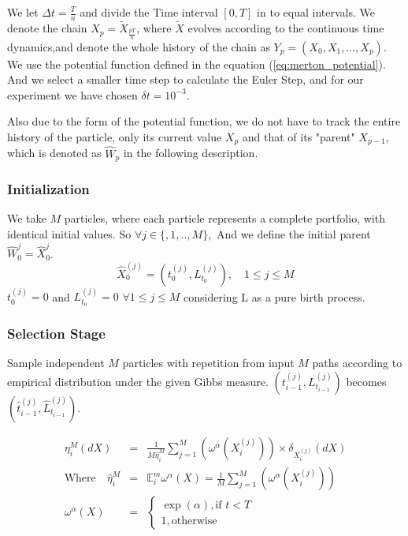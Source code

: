 We let $\Delta t = \frac{T}{n}$ and divide the Time interval $[0,T]$ in to equal 
intervals. We denote the chain $X_p = \tilde{X}_{\frac{pT}{n}}$, where $\tilde{X}$ 
evolves according to the continuous time dynamics,and denote the whole history of 
the chain as $Y_{p} =(X_{0},X_{1},...,X_{p})$. We use the potential function 
defined in the equation (\ref{eq:merton_potential}). And we select a smaller 
time step to calculate the Euler Step, and for our experiment we have chosen 
$\delta t = 10^{-3}$.

Also due to the form of the potential function, we do not have to track the 
entire history of the particle, only its current value $X_p$ and that of its 
"parent" $X_{p-1}$, which is denoted as $\hat{W}_p$ in the following description.

\subsubsection{Initialization}
We take $M$ particles, where each particle represents a complete portfolio, 
with identical initial values. So $\forall j \in \{,1,..,M\},$
And we define the initial parent $\hat{W}_0^{j}=\hat{X}_0^{j}$.
\begin{equation*}
\hat{X}_0^{(j)} = \left( t_{0}^{(j)},L_{t_0}^{(j)} \right),  \quad  1 \leq j\leq M                                                                    
\end{equation*}
$ t_{0}^{(j)} = 0$ and $ L_{t_{0}}^{(j)} = 0$ $\forall 1 \leq j\leq M $ considering L as a pure birth process.


\subsubsection{Selection Stage}
Sample independent $M$ particles with repetition from input $M$ paths according to empirical distribution under the given Gibbs measure.
$\left(t^{(j)}_{i-1}, L_{t_{i-1}}^{(j)} \right)$ becomes $\left( \hat{t}_{i-1}^{(j)}, \hat{L}_{t_{i-1}}^{(j)}\right)$.

\begin{eqnarray*}
\eta_{i}^{M}(dX) & = & \frac{1}{M \hat{\eta}_{i}^{M}}\sum_{j=1}^{M}\left(\omega^{\alpha}(X_{i}^{(j)})\right) \times \delta_{{X}_i^{(j)}}(dX) \\
\text{Where} \quad
\hat{\eta}_{i}^{M} & = & \mathbb{E}_{i}^{m}\omega^{\alpha}(X) =
\frac{1}{M}\sum_{j=1}^{M}\left(\omega^{\alpha}(X_{i}^{(j)})\right)\\
\omega^{\alpha}(X) & = &  
\begin{cases}
\exp(\alpha), \text{if } t < T\\
1,               \text{otherwise}
\end{cases}
\end{eqnarray*}


